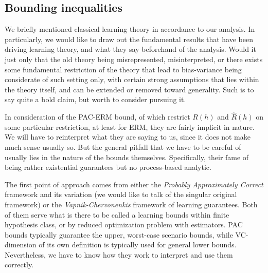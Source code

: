 \subsection{Bounding inequalities}

We briefly mentioned classical learning theory in accordance to our analysis. In particularly, we would like to draw out the fundamental results that have been driving learning theory, and what they say beforehand of the analysis. Would it just only that the old theory being misrepresented, misinterpreted, or there exists some fundamental restriction of the theory that lead to bias-variance being considerate of such setting only, with certain strong assumptions that lies within the theory itself, and can be extended or removed toward generality. Such is to say quite a bold claim, but worth to consider pursuing it. 

In consideration of the PAC-ERM bound, of which restrict $R(h)$ and $\hat{R}(h)$ on some particular restriction, at least for ERM, they are fairly implicit in nature. We will have to reinterpret what they are saying to us, since it does not make much sense usually so. But the general pitfall that we have to be careful of usually lies in the nature of the bounds themselves. Specifically, their fame of being rather existential guarantees but no process-based analytic. 

The first point of approach comes from either the \textit{Probably Approximately Correct} framework and its variation (we would like to talk of the singular original framework) or the \textit{Vapnik-Chervonenkis} framework of learning guarantees. Both of them serve what is there to be called a learning bounds within finite hypothesis class, or by reduced optimization problem with estimators. PAC bounds typically guarantee the upper, worst-case scenario bounds, while VC-dimension of its own definition is typically used for general lower bounds. Nevertheless, we have to know how they work to interpret and use them correctly.

